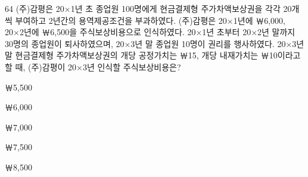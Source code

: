 \begin{question}{64}
(주)감평은 20×1년 초 종업원 100명에게 현금결제형 주가차액보상권을 각각 20개씩 부여하고 2년간의 용역제공조건을 부과하였다. (주)감평은 20×1년에 ￦6,000, 20×2년에 ￦6,500을 주식보상비용으로 인식하였다. 20×1년 초부터 20×2년 말까지 30명의 종업원이 퇴사하였으며, 20×3년 말 종업원 10명이 권리를 행사하였다. 20×3년 말 현금결제형 주가차액보상권의 개당 공정가치는 ￦15, 개당 내재가치는 ￦10이라고 할 때, (주)감평이 20×3년 인식할 주식보상비용은?
\begin{choices}
  \item ￦5,500
  \item ￦6,000
  \item ￦7,000
  \item ￦7,500
  \item ￦8,500
\end{choices}
\end{question}
